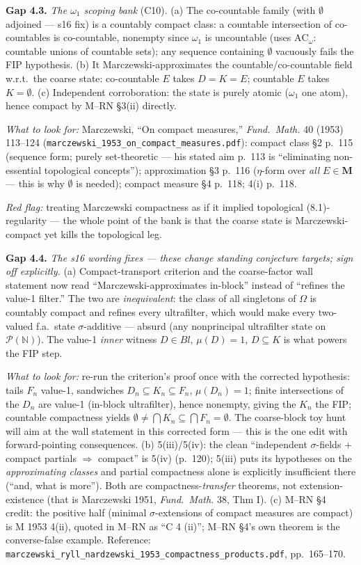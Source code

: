 \documentclass[11pt]{article}
\newcommand{\file}[1]{\texttt{\small #1}}
\newcommand{\gap}[1]{\medskip\noindent\textbf{Gap #1.}}
\newcommand{\lookfor}{\par\smallskip\noindent\emph{What to look for:} }
\newcommand{\redflag}{\par\smallskip\noindent\emph{Red flag:} }
\begin{document}
\gap{4.3} \emph{The $\omega_1$ scoping bank} (C10). (a) The
co-countable family (with $\emptyset$ adjoined --- s16 fix) is a
countably compact class: a countable intersection of co-countables is
co-countable, nonempty since $\omega_1$ is uncountable (uses
$\mathrm{AC}_\omega$: countable unions of countable sets); any
sequence containing $\emptyset$ vacuously fails the FIP hypothesis.
(b) It Marczewski-approximates the countable/co-countable field
w.r.t.\ the coarse state: co-countable $E$ takes $D = K = E$;
countable $E$ takes $K = \emptyset$. (c) Independent corroboration:
the state is purely atomic ($\omega_1$ one atom), hence compact by
M--RN \S3(ii) directly.
\lookfor Marczewski, ``On compact measures,'' \emph{Fund.\ Math.} 40
(1953) 113--124 (\file{marczewski\_1953\_on\_compact\_measures.pdf}):
compact class \S2 p.~115 (sequence form; purely set-theoretic --- his
stated aim p.~113 is ``eliminating non-essential topological
concepts''); approximation \S3 p.~116 ($\eta$-form over \emph{all}
$E \in \mathbf M$ --- this is why $\emptyset$ is needed); compact
measure \S4 p.~118; 4(i) p.~118.
\redflag treating Marczewski compactness as if it implied topological
(8.1)-regularity --- the whole point of the bank is that the coarse
state is Marczewski-compact yet kills the topological leg.

\gap{4.4} \emph{The s16 wording fixes --- these change standing
conjecture targets; sign off explicitly.} (a) Compact-transport
criterion and the coarse-factor wall statement now read
``Marczewski-approximates in-block'' instead of ``refines the value-1
filter.'' The two are \emph{inequivalent}: the class of all singletons
of $\Omega$ is countably compact and refines every ultrafilter, which
would make every two-valued f.a.\ state $\sigma$-additive ---
absurd (any nonprincipal ultrafilter state on $\mathcal P(\mathbb N)$).
The value-1 \emph{inner} witness $D \in Bl$, $\mu(D) = 1$,
$D \subseteq K$ is what powers the FIP step.
\lookfor re-run the criterion's proof once with the corrected
hypothesis: tails $F_n$ value-1, sandwiches $D_n \subseteq K_n
\subseteq F_n$, $\mu(D_n) = 1$; finite intersections of the $D_n$
are value-1 (in-block ultrafilter), hence nonempty, giving the $K_n$
the FIP; countable compactness yields $\emptyset \neq \bigcap K_n
\subseteq \bigcap F_n = \emptyset$. The coarse-block toy hunt will
aim at the wall statement in this corrected form --- this is the one
edit with forward-pointing consequences.
(b) 5(iii)/5(iv): the clean ``independent $\sigma$-fields $+$ compact
partials $\Rightarrow$ compact'' is 5(iv) (p.~120); 5(iii) puts its
hypotheses on the \emph{approximating classes} and partial
compactness alone is explicitly insufficient there (``and, what is
more''). Both are compactness-\emph{transfer} theorems, not
extension-existence (that is Marczewski 1951, \emph{Fund.\ Math.} 38,
Thm I). (c) M--RN \S4 credit: the positive half (minimal
$\sigma$-extensions of compact measures are compact) is M 1953 4(ii),
quoted in M--RN as ``C 4 (ii)''; M--RN \S4's own theorem is the
converse-false example. Reference:
\file{marczewski\_ryll\_nardzewski\_1953\_compactness\_products.pdf},
pp.~165--170.
\end{document}
